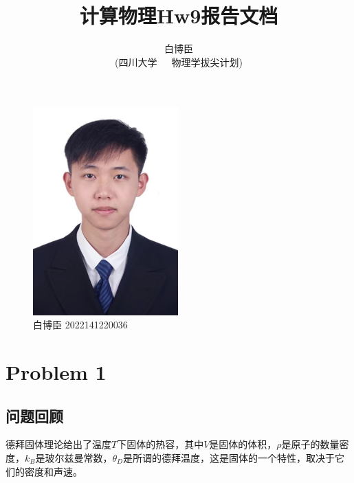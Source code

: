 \documentclass[12pt,a4paper]{article}%
\title{\fontsize{18pt}{27pt}\selectfont%
{\heiti%
计算物理Hw9报告文档}}%
\author{\fontsize{12pt}{18pt}\selectfont%
{\fangsong%
白博臣}\\%
\fontsize{10.5pt}{15.75pt}\selectfont%
{\fangsong%
(四川大学~~~物理学拔尖计划)}}%
\date{}%
\begin{document}
    \maketitle%
    \lhead{}%
    \chead{}%
    \rhead{}%
    \lfoot{}%
    \cfoot{\thepage}%
    \rfoot{}%

    \begin{figure}[htbp]
        \centering
        \includegraphics[height=8cm]{bbc.jpg}
        \caption{白博臣 2022141220036}
    \end{figure}

    \newpage%


    \section{Problem 1}

    \subsection{问题回顾}
    德拜固体理论给出了温度$T$下固体的热容，其中$V$是固体的体积，$\rho$是原子的数量密度，$k_B$是玻尔兹曼常数，$\theta_D$是所谓的德拜温度，这是固体的一个特性，取决于它们的密度和声速。
\end{document}
